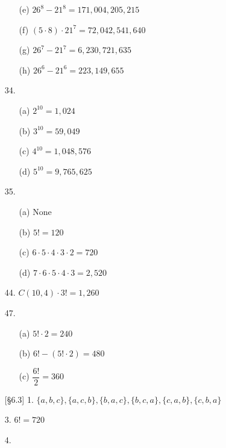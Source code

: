 \documentclass{article}
\begin{document}
\begin{enumerate}
\begin{itemize}
            \item[(e)] $26^8 - 21^8 = 171,004,205,215$
            \item[(f)] $(5 \cdot 8) \cdot 21^7 = 72,042,541,640$
            \item[(g)] $26^7 - 21^7 = 6,230,721,635$
            \item[(h)] $26^6 - 21^6 = 223,149,655$
        \end{itemize}
    \item[34.]
        \begin{itemize}
            \item[(a)] $2^{10} = 1,024$
            \item[(b)] $3^{10} = 59,049$
            \item[(c)] $4^{10} = 1,048,576$
            \item[(d)] $5^{10} = 9,765,625$
        \end{itemize}
    \item[35.]
        \begin{itemize}
            \item[(a)] None
            \item[(b)] $5! = 120$
            \item[(c)] $6 \cdot 5 \cdot 4 \cdot 3 \cdot 2 = 720$
            \item[(d)] $7 \cdot 6 \cdot 5 \cdot 4 \cdot 3 = 2,520$
        \end{itemize}
    \item[44.] $C(10,4) \cdot 3! = 1,260$
    \item[47.]
        \begin{itemize}
            \item[(a)] $5! \cdot 2 = 240$
            \item[(b)] $6! - (5! \cdot 2) = 480$
            \item[(c)] $\dfrac{6!}{2} = 360$
        \end{itemize}
    \item[{[\S 6.3]} 1.] $\{a, b, c\}, \{a, c, b\}, \{b, a, c\}, \{b, c, a\}, \{c, a, b\}, \{c, b, a\} $
    \item[3.] $6! = 720$
    \item[4.]
\end{enumerate}
\end{document}

